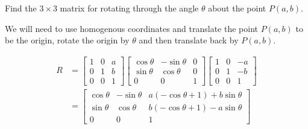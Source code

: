 \documentclass[../main.tex]{subfiles}
\begin{document}
Find the $3 \times 3$ matrix for rotating through the angle $\theta$ about the point $P(a, b)$.

\solution

We will need to use homogenous coordinates and translate the point $P(a,b)$ to be the origin, 
rotate the origin by $\theta$ and then translate back by $P(a,b)$. 

\begin{align*}
	R
	&=
	\begin{bmatrix}
		1 & 0 & a\\
		0 & 1 & b\\
		0 & 0 & 1
	\end{bmatrix}
	\begin{bmatrix}
		\cos \theta & - \sin \theta & 0\\
		\sin \theta & \cos \theta & 0\\
		0 & 0 & 1
	\end{bmatrix}
	\begin{bmatrix}
		1 & 0 & -a\\
		0 & 1 & -b\\
		0 & 0 & 1
	\end{bmatrix}
	\\&=
	\begin{bmatrix}
		\cos \theta & -\sin\theta & a(-\cos\theta+1)+b\sin\theta\\
		\sin\theta & \cos\theta & b(-\cos\theta+1)-a\sin\theta\\
		0&0&1
	\end{bmatrix}
\end{align*}
\end{document}
